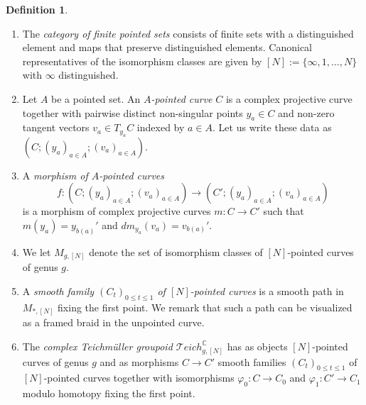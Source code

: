 \documentclass[11pt]{report}
\theoremstyle{definition}
\newtheorem{definition}[theorem]{Definition}
\theoremstyle{remark}
\theoremstyle{remark}
\newcommand{\C}{\mathbb{C}}
\begin{document}
\begin{definition}
\begin{enumerate}[label=(\roman*)]
\item The \emph{category of finite pointed sets} consists of finite sets with a distinguished element and maps that preserve distinguished elements. Canonical representatives of the isomorphism classes are given by $[N] := \{ \infty,1,...,N \}$ with $\infty$ distinguished.
\item Let $A$ be a pointed set. An \emph{$A$-pointed curve} $C$ is a complex projective curve together with pairwise distinct non-singular points $y_a \in C$ and non-zero tangent vectors $v_a \in T_{y_a} C$ indexed by $a \in A$. Let us write these data as $(C;(y_a)_{a \in A};(v_a)_{a \in A})$.
\item A \emph{morphism of $A$-pointed curves}
\begin{equation*}
f: (C;(y_a)_{a \in A};(v_a)_{a \in A}) \to (C';(y_{a})_{a \in A};(v_{a})_{a \in A})
\end{equation*}
is a morphism of complex projective curves $m: C \to C'$ such that $m(y_a) = y_{b(a)}'$ and $dm_{y_a}(v_a) = v_{b(a)}'$.
\item We let $M_{g,[N]}$ denote the set of isomorphism classes of $[N]$-pointed curves of genus $g$.
\item A \emph{smooth family $(C_t)_{0 \leq t \leq 1}$ of $[N]$-pointed curves} is a smooth path in $M_{*,[N]}$ fixing the first point. We remark that such a path can be visualized as a framed braid in the unpointed curve.
\item The \emph{complex Teichmüller groupoid $\mathcal{T}eich_{g,[N]}^\C$} has as objects $[N]$-pointed curves of genus $g$ and as morphisms $C \to C'$ smooth families $(C_t)_{0 \leq t \leq 1}$ of $[N]$-pointed curves together with isomorphisms $\varphi_0: C \to C_0$ and $\varphi_1: C' \to C_1$ modulo homotopy fixing the first point.
\end{enumerate}
\end{definition}
\end{document}
